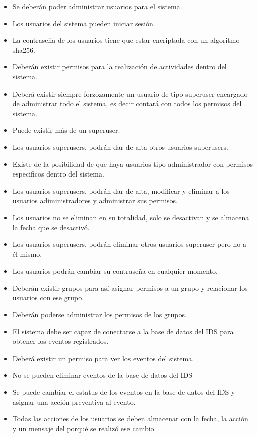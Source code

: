 \begin{itemize}
    \item Se deberán poder administrar usuarios para el sistema.
    \item Los usuarios del sistema pueden iniciar sesión.
    \item La contraseña de los usuarios tiene que estar encriptada con un algoritmo sha256.
    \item Deberán existir permisos para la realización de actividades dentro del sistema.
    \item Deberá existir siempre forzozamente un usuario de tipo superuser encargado de administrar todo el sistema, es decir contará con todos los permisos del sistema.
    \item Puede existir más de un superuser.
    \item Los usuarios superusers, podrán dar de alta otros usuarios superusers.
    \item Existe de la posibilidad de que haya usuarios tipo administrador con permisos especificos dentro del sistema.
    \item Los usuarios superusers, podrán dar de alta, modificar y eliminar a los usuarios adiministradores y administrar sus permisos.
    \item Los usuarios no se eliminan en su totalidad, solo se desactivan y se almacena la fecha que se desactivó.
    \item Los usuarios superusers, podrán eliminar otros usuarios superuser pero no a él mismo.
    \item Los usuarios podrán cambiar su contraseña en cualquier momento.
    \item Deberán existir grupos para así asignar permisos a un grupo y relacionar los usuarios con ese grupo.
    \item Deberán poderse administrar los permisos de los grupos.
    \item El sistema debe ser capaz de conectarse a la base de datos del IDS para obtener los eventos registrados.
    \item Deberá existir un permiso para ver los eventos del sistema.
    \item No se pueden eliminar eventos de la base de datos del IDS
    \item Se puede cambiar el estatus de los eventos en la base de datos del IDS y asignar una acción preventiva al evento.
    \item Todas las acciones de los usuarios se deben almacenar con la fecha, la acción y un mensaje del porqué se realizó ese cambio.

\end{itemize}
